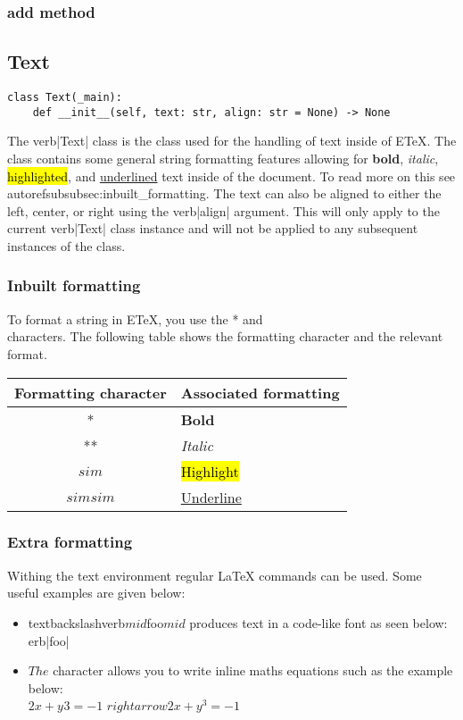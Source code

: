 \documentclass{article}
\begin{document}
\subsubsection{add method}\label{subsubsec:add_method001}

\subsection{Text}\label{subsec:text}
\begin{verbatim}
class Text(_main):
	def __init__(self, text: str, align: str = None) -> None
\end{verbatim}
The verb|Text| class is the class used for the handling of text inside of ETeX. The class contains some general string formatting features allowing for \textbf{bold}, \textit{italic}, \hl{highlighted}, and \underline{underlined} text inside of the document. To read more on this see autoref{subsubsec:inbuilt_formatting}. The text can also be aligned to either the left, center, or right using the verb|align| argument. This will only apply to the current verb|Text| class instance and will not be applied to any subsequent instances of the class.
\subsubsection{Inbuilt formatting}\label{subsubsec:inbuilt_formatting}
To format a string in ETeX, you use the * and \\
{} characters. The following table shows the formatting character and the relevant format.\\

\begin{center}
\begin{tabular}{| c | l |}
\hline
Formatting character & Associated formatting \\ \hline
* & \textbf{Bold} \\
** & \textit{Italic} \\
$sim$ & \hl{Highlight} \\
$simsim$ & \underline{Underline} \\
\hline
\end{tabular}
\end{center}

\subsubsection{Extra formatting}\label{subsubsec:extra_formatting}
Withing the text environment regular LaTeX  commands can be used. Some useful examples are given below:\begin{itemize}
\item {textbackslash}verb$mid${foo}$mid$ produces text in a code-like font as seen below:\\
erb|foo|
\item $The $ character allows you to write inline maths equations such as the example below:\\
$2x+y^{}3=-1$ $rightarrow 2x+y^3=-1$
\end{itemize}
\end{document}
